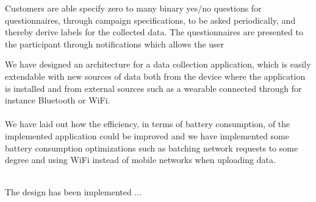 Customers are able specify zero to many binary yes/no questions for questionnaires, through campaign specifications, to be asked periodically, and thereby derive labels for the collected data. The questionnaires are presented to the participant through notifications which allows the user 


We have designed an architecture for a data collection application, which is easily extendable with new sources of data both from the device where the application is installed and from external sources such as a wearable connected through for instance Bluetooth or WiFi. 
\\\\
We have laid out how the efficiency, in terms of battery consumption, of the implemented application could be improved and we have implemented some battery consumption optimizations such as batching network requests to some degree and using WiFi instead of mobile networks when uploading data.
\\\\




The design has been implemented ...